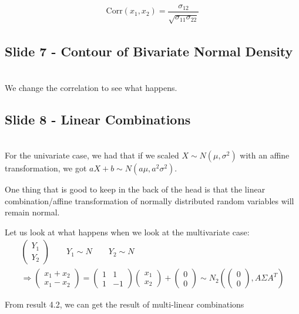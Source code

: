 \begin{equation*}
  \begin{gathered}
    \text{Corr}(x_1,x_2) = \dfrac{\sigma_{12}}{\sqrt{\sigma_{11}\sigma_{22}}}
  \end{gathered}
\end{equation*}
\par\bigskip
\subsection{Slide 7 - Contour of Bivariate Normal Density}\hfill\\
\noindent We change the correlation to see what happens.
\par\bigskip
\subsection{Slide 8 - Linear Combinations}\hfill\\
\noindent For the univariate case, we had that if we scaled $X\sim N(\mu,\sigma^2)$ with an affine transformation, we got $aX+b\sim N(a\mu,a^2\sigma^2)$.
\par\bigskip
\noindent One thing that is good to keep in the back of the head is that the linear combination/affine transformation of normally distributed random variables will remain normal. 
\par\bigskip
\noindent Let us look at what happens when we look at the multivariate case:
\begin{equation*}
  \begin{gathered}
    \begin{pmatrix}Y_1\\ Y_2\end{pmatrix}\qquad Y_1\sim N\qquad Y_2\sim N\\
    \Rightarrow \begin{pmatrix}x_1+x_2\\x_1-x_2\end{pmatrix} = \begin{pmatrix}1&1\\1&-1\end{pmatrix}\begin{pmatrix}x_1\\x_2\end{pmatrix}+\begin{pmatrix}0\\0\end{pmatrix}\sim N_2\left(\begin{pmatrix}0\\0\end{pmatrix}, A\Sigma A^T\right)
  \end{gathered}
\end{equation*}
\par\bigskip
\noindent From result 4.2, we can get the result of multi-linear combinations
\par\bigskip
